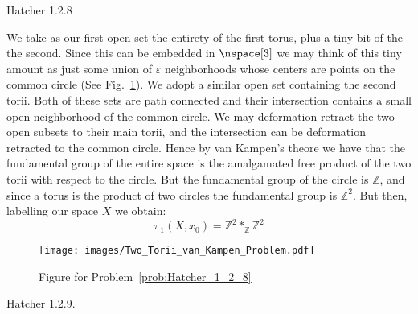 \documentclass{article}                                                        %
\begin{document}
    \begin{problem}
        \label{prob:Hatcher_1_2_8}%
        Hatcher 1.2.8
    \end{problem}
    \begin{solution}
        We take as our first open set the entirety of the first torus, plus a
        tiny bit of the the second. Since this can be embedded in $\nspace[3]$
        we may think of this tiny amount as just some union of $\varepsilon$
        neighborhoods whose centers are points on the common circle
        (See Fig.~\ref{fig:Fig_Prob_Hatcher_1_2_8a}). We adopt a similar open set
        containing the second torii. Both of these sets are path connected and
        their intersection contains a small open neighborhood of the common
        circle. We may deformation retract the two open subsets to their main
        torii, and the intersection can be deformation retracted to the common
        circle. Hence by van Kampen's theore we have that the fundamental group
        of the entire space is the amalgamated free product of the two torii
        with respect to the circle. But the fundamental group of the circle is
        $\mathbb{Z}$, and since a torus is the product of two circles the
        fundamental group is $\mathbb{Z}^{2}$. But then, labelling our space $X$
        we obtain:
        \begin{equation}
            \pi_{1}(X,x_{0})=\mathbb{Z}^{2}*_{\mathbb{Z}}\mathbb{Z}^{2}
        \end{equation}
        \begin{figure}[H]
            \centering
            \captionsetup{type=figure}
            \texttt{[image: images/Two\_Torii\_van\_Kampen\_Problem.pdf]}
            \caption{Figure for Problem~\ref{prob:Hatcher_1_2_8}}
            \label{fig:Fig_Prob_Hatcher_1_2_8a}
        \end{figure}
    \end{solution}
    \begin{problem}
        \label{prob:Hatcher_1_2_9}%
        Hatcher 1.2.9.
    \end{problem}
\end{document}
